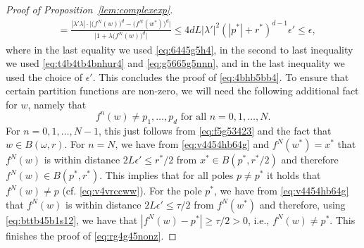 \documentclass[11pt]{article}
\newcommand{\fn}[2]{#1^{#2}}
\begin{document}
\begin{proof}[Proof of Proposition~\ref{lem:complexexp}]
\begin{equation*}
\begin{aligned}
&=\frac{|\lambda'\lambda|\cdot\big|\big(\fn{f}{N}(w)\big)^{d}-\big(\fn{f}{N}(w^*)\big)^{d}\big|}{\big|1+\lambda \big(f^{N}(w)\big)^{d}\big|}\leq 4d L|\lambda'|^2(|p^*|+r^*)^{d-1}\epsilon'\leq \epsilon,
\end{aligned}
\end{equation*}
where in the last equality we used \eqref{eq:6445g5h4}, in the second to last inequality we used \eqref{eq:t4b4tb4bnhur4} and \eqref{eq:g5665g5nnn}, and in the last inequality we used the choice of $\epsilon'$. This concludes the proof of \eqref{eq:4bhb5bb4}. To ensure that certain partition functions are non-zero, we will need the following additional fact for $w$, namely that 
\begin{equation}\label{eq:rg4g45nonz}
\fn{f}{n}(w)\neq p_1,\hdots,p_d \mbox{ for all } n=0,1,\hdots, N.
\end{equation}
For $n=0,1,\hdots, N-1$, this just follows from \eqref{eq:f5g53423} and the fact that $w\in B(\omega,r)$. For $n=N$, we have from \eqref{eq:v4454hb64g} and $f^{N}(w^*)=x^*$  that $f^{N}(w)$ is within distance $2L\epsilon'\leq r^*/2$ from $x^*\in B(p^*,r^*/2)$ and therefore $f^{N}(w)\in B(p^*,r^*)$. This implies that for all poles $p\neq p^*$ it holds that $f^{N}(w)\neq p$ (cf. \eqref{eq:v4vrccww}). For the pole $p^*$, we have from \eqref{eq:v4454hb64g} that $f^{N}(w)$ is within distance $2L\epsilon'\leq \tau/2$ from $f^{N}(w^*)$ and therefore, using \eqref{eq:bttb45b1s12}, we have that $|f^{N}(w)-p^*|\geq \tau/2>0$, i.e., $f^{N}(w)\neq p^*$. This finishes the proof of \eqref{eq:rg4g45nonz}.





\end{proof}
\end{document}
